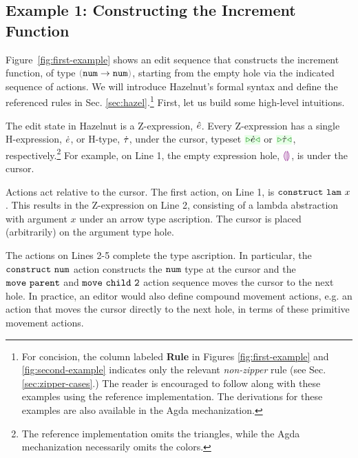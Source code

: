 \subsection{Example 1: Constructing the Increment Function}

Figure~\ref{fig:first-example} shows an edit sequence that constructs the
increment function, of type $\tarr{\tnum}{\tnum}$, starting from the empty
hole via the indicated sequence of {actions}. We will introduce Hazelnut's
formal syntax and define the referenced rules in
Sec. \ref{sec:hazel}.\footnote{For concision, the column labeled \textbf{Rule} in Figures \ref{fig:first-example} and \ref{fig:second-example} 
indicates only the relevant \emph{non-zipper} rule (see Sec. \ref{sec:zipper-cases}.) The reader is encouraged to follow along with these examples using the reference implementation. The derivations for these examples are also available in the Agda mechanization.} First, let us build some high-level intuitions.

The edit state in Hazelnut is a {Z-expression}, $\hat{e}$. Every Z-expression
has a single {H-expression}, $\dot{e}$, or {H-type}, $\dot{\tau}$, under the
{cursor}, typeset $\zwsel{\hexp}$ or $\zwsel{\htau}$, respectively.\footnote{The reference implementation omits the triangles, while the Agda mechanization necessarily omits the colors.} For
example, on Line 1, the empty expression hole, $\textcolor{violet}{\llparenthesis}\textcolor{violet}{\rrparenthesis}$, is under the
cursor.

Actions act relative to the cursor. The first action, on Line 1, is
$\mathtt{construct}~\mathtt{lam}~x$. This results in the Z-expression on
Line 2, consisting of a lambda abstraction with argument $x$ under an arrow type
ascription. The cursor is placed (arbitrarily) on the argument type hole.

The actions on Lines 2-5 complete the type ascription. In particular, the
$\mathtt{construct}~\mathtt{num}$ action constructs the $\texttt{num}$ type at the cursor and
the $\mathtt{move}~\mathtt{parent}$ and $\mathtt{move}~\mathtt{child}~\mathtt{{2}}$ action sequence 
moves the cursor to the next hole. In practice, an editor would also define compound movement
actions, e.g. an action that moves the cursor directly to the next
 hole, in terms of these primitive movement actions.

